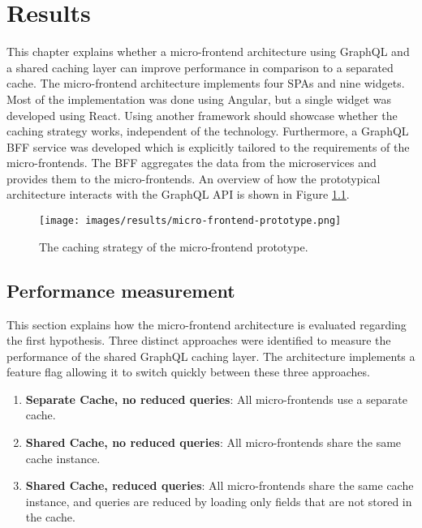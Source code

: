 \chapter{Results}\label{chapter:results}

This chapter explains whether a micro-frontend architecture using GraphQL and a shared caching layer can improve performance in comparison to a separated cache. The micro-frontend architecture implements four \acp{SPA} and nine widgets. Most of the implementation was done using Angular, but a single widget was developed using React. Using another framework should showcase whether the caching strategy works, independent of the technology. Furthermore, a GraphQL \ac{BFF} service was developed which is explicitly tailored to the requirements of the micro-frontends. The \ac{BFF} aggregates the data from the microservices and provides them to the micro-frontends. An overview of how the prototypical architecture interacts with the GraphQL \ac{API} is shown in Figure \ref{fig:results:micro-frontend-prototype}.

\ifshowImages
\begin{figure}[H]
  \centering
  \texttt{[image: images/results/micro-frontend-prototype.png]}
  \caption{The caching strategy of the micro-frontend prototype.}\label{fig:results:micro-frontend-prototype}
\end{figure}
\fi

\section{Performance measurement}\label{section:results:performance-measurement}

This section explains how the micro-frontend architecture is evaluated regarding the first hypothesis. Three distinct approaches were identified to measure the performance of the shared GraphQL caching layer. The architecture implements a feature flag allowing it to switch quickly between these three approaches.

\begin{enumerate}
  \item \textbf{Separate Cache, no reduced queries}: All micro-frontends use a separate cache.
  \item \textbf{Shared Cache, no reduced queries}: All micro-frontends share the same cache instance.
  \item \textbf{Shared Cache, reduced queries}: All micro-frontends share the same cache instance, and queries are reduced by loading only fields that are not stored in the cache.
\end{enumerate}

